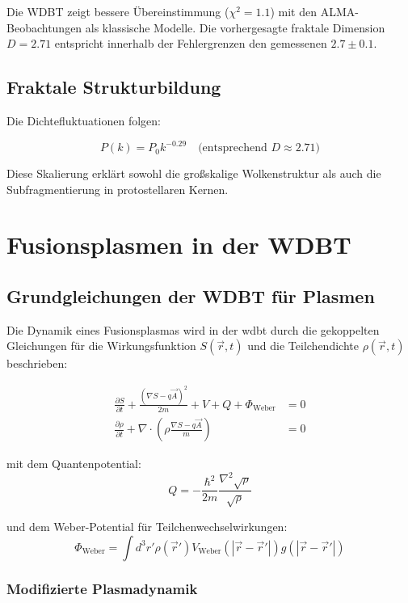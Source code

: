 Die WDBT zeigt bessere Übereinstimmung ($\chi^2 = 1.1$) mit den ALMA-Beobachtungen als klassische Modelle. Die vorhergesagte fraktale Dimension $D = 2.71$ entspricht innerhalb der Fehlergrenzen den gemessenen $2.7 \pm 0.1$.

\section{Fraktale Strukturbildung}
Die Dichtefluktuationen folgen:

\begin{equation}
P(k) = P_0 k^{-0.29} \quad \text{(entsprechend } D \approx 2.71\text{)}
\end{equation}

Diese Skalierung erklärt sowohl die großskalige Wolkenstruktur als auch die Subfragmentierung in protostellaren Kernen.

\chapter{Fusionsplasmen in der WDBT}
\section{Grundgleichungen der WDBT für Plasmen}

Die Dynamik eines Fusionsplasmas wird in der \gls{wdbt} durch die gekoppelten Gleichungen für die Wirkungsfunktion $S(\vec{r},t)$ und die Teilchendichte $\rho(\vec{r},t)$ beschrieben:

\begin{align}
\frac{\partial S}{\partial t} + \frac{(\nabla S - q\vec{A})^2}{2m} + V + Q + \Phi_{\text{Weber}} &= 0 \label{eq:C1} \\
\frac{\partial \rho}{\partial t} + \nabla \cdot \left(\rho \frac{\nabla S - q\vec{A}}{m}\right) &= 0 \label{eq:C2}
\end{align}

mit dem Quantenpotential:
\begin{equation}
Q = -\frac{\hbar^2}{2m} \frac{\nabla^2 \sqrt{\rho}}{\sqrt{\rho}} \label{eq:Q}
\end{equation}

und dem Weber-Potential für Teilchenwechselwirkungen:
\begin{equation}
\Phi_{\text{Weber}} = \int d^3r' \rho(\vec{r}') V_{\text{Weber}}(|\vec{r}-\vec{r}'|) g(|\vec{r}-\vec{r}'|)
\end{equation}

\subsection{Modifizierte Plasmadynamik}

